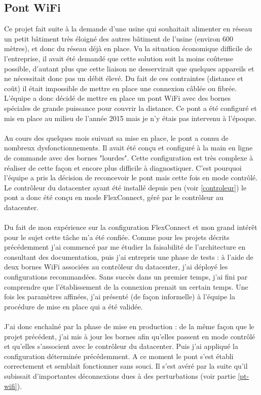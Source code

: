 \documentclass[a4paper,12pt]{report}
\begin{document}
\subsection{Pont WiFi}\label{pont_wifi}
Ce projet fait suite à la demande d'une usine qui souhaitait alimenter en réseau un petit bâtiment très éloigné  des autres bâtiment de l'usine (environ 600 mètres), et donc du réseau déjà en place. Vu la situation économique difficile de l'entreprise, il avait été demandé que cette solution soit la moins coûteuse possible, d'autant plus que cette liaison ne desservirait que quelques appareils et ne nécessitait donc pas un débit élevé. Du fait de ces contraintes (distance et coût) il était impossible de mettre en place une connexion câblée ou fibrée. L'équipe a donc décidé de mettre en place un pont WiFi avec des bornes spéciales de grande puissance pour couvrir la distance.
Ce pont a été configuré et mis en place au milieu de l'année 2015 mais je n'y étais pas intervenu à l'époque.
\paragraph{}
Au cours des quelques mois suivant sa mise en place, le pont a connu de nombreux dysfonctionnements. Il avait été conçu et configuré à la main en ligne de commande avec des bornes "lourdes". Cette configuration est très complexe à réaliser de cette façon et encore plus difficile à diagnostiquer. C'est pourquoi l'équipe a pris la décision de reconcevoir le pont mais cette fois en mode contrôlé. Le contrôleur du datacenter ayant été installé depuis peu (voir \ref{controleur}) le pont a donc été conçu en mode FlexConnect, géré par le contrôleur au datacenter.
\paragraph{}
Du fait de mon expérience sur la configuration FlexConnect et mon grand intérêt pour le sujet cette tâche m'a été confiée. Comme pour les projets décrits précédemment j'ai commencé par me étudier la faisabilité de l'architecture en consultant des documentation, puis j'ai entrepris une phase de tests : à l'aide de deux bornes WiFi associées au contrôleur du datacenter, j'ai déployé les configurations recommandées. Sans succès dans un premier temps, j'ai fini par comprendre que l'établissement de la connexion prenait un certain temps. Une fois les paramètres affinées, j'ai présenté (de façon informelle) à l'équipe la procédure de mise en place qui a été validée.
\paragraph{}
J'ai donc enchaîné par la phase de mise en production : de la même façon que le projet précédent, j'ai mis à jour les bornes afin qu'elles passent en mode contrôlé et qu'elles s'associent avec le contrôleur du datacenter. Puis j'ai appliqué la configuration déterminée précédemment. A ce moment le pont s'est établi correctement et semblait fonctionner sans souci. Il s'est avéré par la suite qu'il subissait d'importantes déconnexions dues à des perturbations (voir partie \ref{pt-wifi}).
\end{document}
